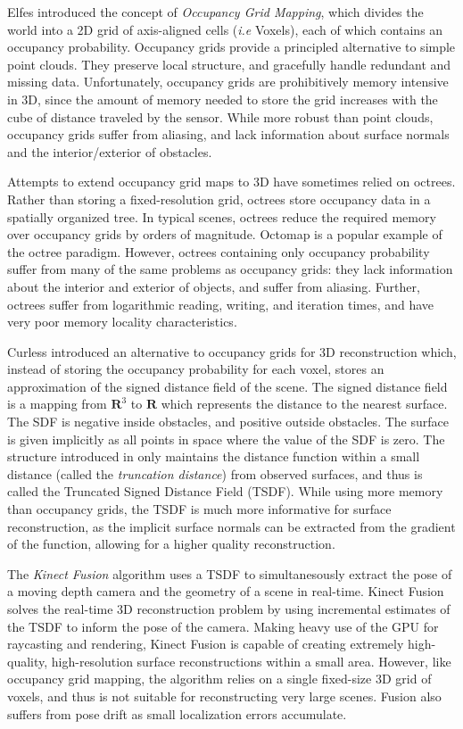 \documentclass[conference,10pt]{IEEEtran}
\begin{document}
Elfes \cite{Elfes1989} introduced the concept of \emph{Occupancy Grid
Mapping}, which divides the world into a 2D grid of axis-aligned cells
(\emph{i.e} Voxels), each of which contains an occupancy probability. Occupancy
grids provide a principled alternative to simple point clouds. They preserve local
structure, and gracefully handle redundant and missing data.
Unfortunately, occupancy grids are prohibitively memory intensive in 3D, since
the amount of memory needed to store the grid increases with the cube of distance 
traveled by the sensor. While more robust than point clouds, occupancy grids
suffer from aliasing, and lack information about surface normals and the
interior/exterior of obstacles.

Attempts to extend occupancy grid maps to 3D have sometimes relied on octrees.
Rather than storing a fixed-resolution grid, octrees store occupancy data in a
spatially organized tree. In typical scenes, octrees reduce the required memory
over occupancy grids by orders of magnitude. Octomap \cite{Wurm2010} is a
popular example of the octree paradigm. However, octrees containing only
occupancy probability suffer from many of the same problems as occupancy grids:
they lack information about the interior and exterior of objects, and suffer
from aliasing. Further, octrees suffer from logarithmic reading, writing, and
iteration times, and have very poor memory locality characteristics.

Curless \cite{Curless1996} introduced an alternative to occupancy grids for 3D
reconstruction which, instead of storing the occupancy probability for each
voxel, stores an approximation of the signed distance field of the scene. The signed distance
field is a mapping from $\mathbf{R}^3$ to $\mathbf{R}$ which represents the
distance to the nearest surface. The SDF is negative inside obstacles, and
positive outside obstacles. The surface is given implicitly as all points in
space where the value of the SDF is zero. The structure introduced in
\cite{Curless1996} only maintains the distance function within a small distance 
(called the \emph{truncation distance}) from observed surfaces, and thus is called the
Truncated Signed Distance Field (TSDF).  While using more memory than occupancy
grids, the TSDF is much more informative for surface reconstruction, as the
implicit surface normals can be extracted from the gradient of the function,
allowing for a higher quality reconstruction.

The \emph{Kinect Fusion} \cite{Newcombe} algorithm uses a TSDF to
simultanesously extract the pose of a moving depth camera and the geometry of a scene in real-time. Kinect
Fusion solves the real-time 3D reconstruction problem by using incremental
estimates of the TSDF to inform the pose of the camera. Making heavy use of the
GPU for raycasting and rendering, Kinect Fusion is capable of creating extremely
high-quality, high-resolution surface reconstructions within a small area.
However, like occupancy grid mapping, the algorithm relies on a single
fixed-size 3D grid of voxels, and thus is not suitable for reconstructing very
large scenes. Fusion also suffers from pose drift as small localization errors
accumulate.
\end{document}
